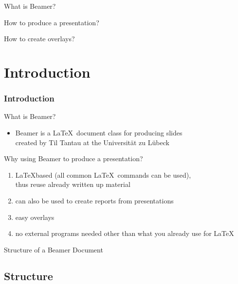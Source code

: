 \documentclass[c,8pt,xcolor...,x11names]{beamer}
\begin{document}
 
\begin{frame}
\customtitle
\begin{list2}
\item What is {\sc Beamer}?
\item How to produce a presentation?
\item How to create overlays?
\end{list2}
\end{frame}


 \section{Introduction} %


 \begin{frame}
  \frametitle{Introduction}

 {\color{blue}What is {\sc Beamer}?}
    \begin{itemize}
    \item 
        {\sc Beamer} is a \LaTeX\ document class for producing slides
\\
created by Til Tantau at the Universit\"at zu L\"ubeck    
    \end{itemize}
 {\color{blue}Why using {\sc Beamer} to produce a presentation?}
\begin{enumerate}
 \item \LaTeX  based (all common \LaTeX\ commands can be used), \\
thus reuse already written up material
\item can also be used to create reports from
        presentations
\item  easy overlays
\item no external programs needed other than what you already use for \LaTeX
\end{enumerate}

\end{frame}


\begin{frame}
\vfill
\begin{LARGE}
\hfill Structure of a {\sc Beamer} Document \hfill 
\end{LARGE}
\vfill
\end{frame}

\subsection{Structure}
\end{document}
